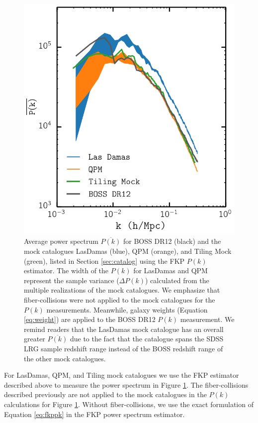 \documentclass{emulateapj}
\begin{document}
\begin{figure}
\begin{center}
\includegraphics[scale=0.5]{fcpaper_pk_comp.png} 
\caption{Average power spectrum $\overline{P(k)}$ for BOSS DR12 (black) and the mock catalogues LasDamas (blue), QPM (orange), and Tiling Mock (green), listed in Section \ref{sec:catalog} using the FKP $P(k)$ estimator. The width of the $P(k)$ for LasDamas and QPM represent the sample variance ($\Delta P(k)$) calculated from the multiple realizations of the mock catalogues. We emphasize that fiber-collisions were not applied to the mock catalogues for the $P(k)$ measurements. Meanwhile, galaxy weights (Equation \ref{eq:weight}) are applied to the BOSS DR12 $P(k)$ measurement. We remind readers that the LasDamas mock catalogue has an overall greater $\overline{P(k)}$ due to the fact that the catalogue spans the SDSS LRG sample redshift range instead of the BOSS redshift range of the other mock catalogues.} \label{fig:mockpk}
\end{center}
\end{figure}

For LasDamas, QPM, and Tiling mock catalogues we use the FKP estimator described above to measure the power spectrum in Figure \ref{fig:mockpk}. The fiber-collisions described previously are not applied to the mock catalogues in the $P(k)$ calculations for Figure \ref{fig:mockpk}. Without fiber-collisions, we use the exact formulation of Equation \ref{eq:fkppk} in the FKP power spectrum estimator. 
\end{document}
